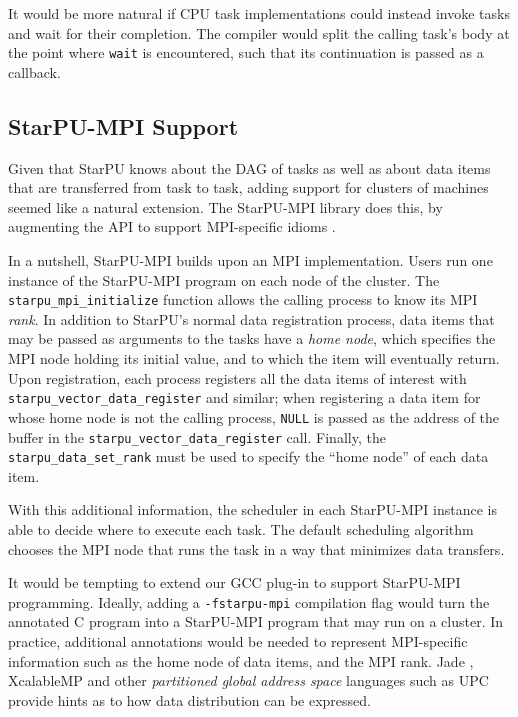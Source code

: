 \documentclass[twoside, a4paper, 10pt]{article}
\begin{document}
It would be more natural if CPU task implementations could instead
invoke tasks and wait for their completion.  The compiler would split
the calling task's body at the point where \texttt{wait} is encountered, such
that its continuation is passed as a callback.
\subsection{StarPU-MPI Support}
\label{sec-5-5}


Given that StarPU knows about the DAG of tasks as well as about data
items that are transferred from task to task, adding support for
clusters of machines seemed like a natural extension.  The StarPU-MPI
library does this, by augmenting the API to support MPI-specific idioms
\cite{augonnet:hal-00725477}.

In a nutshell, StarPU-MPI builds upon an MPI implementation.  Users run
one instance of the StarPU-MPI program on each node of the cluster.  The
\texttt{starpu\_mpi\_initialize} function allows the calling process to know its
MPI \emph{rank}.  In addition to StarPU's normal data registration process,
data items that may be passed as arguments to the tasks have a \emph{home node}, which specifies the MPI node holding its initial value, and to
which the item will eventually return.  Upon registration, each process
registers all the data items of interest with
\texttt{starpu\_vector\_data\_register} and similar; when registering a data item
for whose home node is not the calling process, \texttt{NULL} is passed as the
address of the buffer in the \texttt{starpu\_vector\_data\_register} call.
Finally, the \texttt{starpu\_data\_set\_rank} must be used to specify the ``home
node'' of each data item.

With this additional information, the scheduler in each StarPU-MPI
instance is able to decide where to execute each task.  The default
scheduling algorithm chooses the MPI node that runs the task in a way
that minimizes data transfers.

It would be tempting to extend our GCC plug-in to support StarPU-MPI
programming.  Ideally, adding a \texttt{-fstarpu-mpi} compilation flag would
turn the annotated C program into a StarPU-MPI program that may run on a
cluster.  In practice, additional annotations would be needed to
represent MPI-specific information such as the home node of data items,
and the MPI rank.  Jade \cite{Rinard:1998:DIE:291889.291893}, XcalableMP
\cite{lee10:xcalablemp} and other \emph{partitioned global address space}
languages such as UPC \cite{upc1.2-2005} provide hints as to how data
distribution can be expressed.
\end{document}
